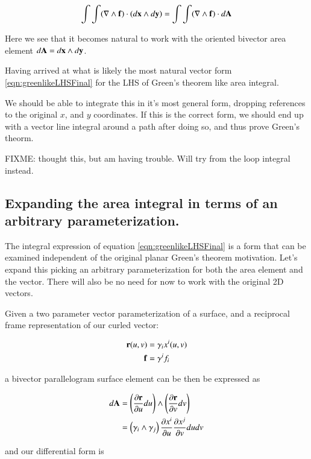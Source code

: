 \documentclass{article}
\newcommand{\grad}[0]{\nabla}
\newcommand{\PD}[2]{\frac{\partial {#2}}{\partial {#1}}}
\begin{document}
\begin{equation}\label{eqn:greenlikeLHSFinal}
\int\int (\grad \wedge \Bf) \cdot (d\Bx \wedge d\By) = \int\int (\grad \wedge \Bf) \cdot d\BA
\end{equation}

Here we see that it becomes natural to work with the oriented bivector area element $d\mathbf{A} = d\mathbf{x} \wedge d\mathbf{y}$.

Having arrived at what is likely the most natural vector form \ref{eqn:greenlikeLHSFinal} for the LHS of Green's theorem like
area integral.

We should be able to 
integrate this in it's most general form, dropping references to the original $x$, and $y$ coordinates.
If this is the correct form, we should end up with a vector line integral around a path after doing so, and thus prove
Green's theorm.


FIXME: thought this, but am having trouble.  Will try from the loop integral instead.

\subsection{ Expanding the area integral in terms of an arbitrary parameterization. }

The integral expression of equation \ref{eqn:greenlikeLHSFinal} is a form that can be examined independent of the original planar Green's theorem motivation.  Let's expand
this picking an arbitrary parameterization for both the area element and the vector.  There will also be no need for now to work with the original 2D vectors.

Given a two parameter vector parameterization of a surface, and a reciprocal frame representation of our curled vector:

\begin{align*}
\mathbf{r}(u,v) &= \gamma_i {x^i}(u,v) \\
\mathbf{f} &= \gamma^i {f_i}
\end{align*}

a bivector parallelogram surface element can be then be expressed as

\begin{align*}
d\BA 
&= \left(\PD{u}{\Br} du\right) \wedge \left(\PD{v}{\Br} dv\right) \\
&= \left(\gamma_i \wedge \gamma_j \right) \PD{u}{x^i} \PD{v}{x^j} du dv \\
\end{align*}

and our differential form is
\end{document}
